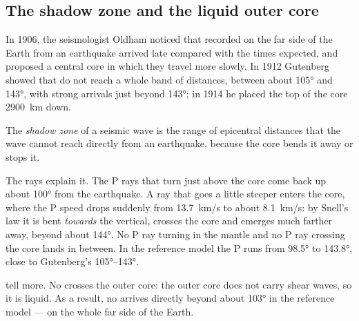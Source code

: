 \subsection{The shadow zone and the liquid outer core}

In 1906, the seismologist Oldham noticed that  recorded on the far side
of the Earth from an earthquake arrived late compared with the times
expected, and proposed a central core in which they travel more slowly. In
1912 Gutenberg showed that  do not reach a whole band of distances,
between about \ang{105} and \ang{143}, with strong arrivals just beyond
\ang{143}; in 1914 he placed the top of the core \qty{2900}{km} down.

\begin{definition}\label{def:g11:seismic-structure:shadow-zone}
The \emph{shadow zone} of a seismic wave is the range of
epicentral distances that the wave cannot reach directly from an
earthquake, because the core bends it away or stops it.
\end{definition}

The rays explain it. The P rays that turn just above the core come back up
about \ang{100} from the earthquake. A ray that goes a little steeper
enters the core, where the P speed drops suddenly from \qty{13.7}{km/s} to
about \qty{8.1}{km/s}: by Snell's law it is bent \emph{towards} the vertical,
crosses the core and emerges much farther away, beyond about \ang{144}. No P
ray turning in the mantle and no P ray crossing the core lands in between.
In the reference model the P  runs from \ang{98.5} to
\ang{143.8}, close to Gutenberg's \ang{105}--\ang{143}.

 tell more. No  crosses the outer core: the outer core does not
carry shear waves, so it is liquid. As a result, no  arrives directly
beyond about \ang{103} in the reference model --- on the whole far side of
the Earth.

